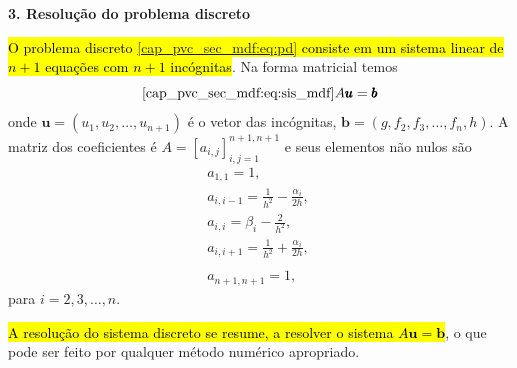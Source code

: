 \begin{flushleft}
  {\bf 3. Resolução do problema discreto}
\end{flushleft}

\hl{O problema discreto {\eqref{cap_pvc_sec_mdf:eq:pd}} consiste em um sistema linear de $n+1$ equações com $n+1$ incógnitas}. Na forma matricial temos
\begin{equation}\eqref{cap_pvc_sec_mdf:eq:sis_mdf}
  A\pmb{u} = \pmb{b}
\end{equation}
onde $\pmb{u} = (u_1, u_2, \dotsc, u_{n+1})$ é o vetor das incógnitas, $\pmb{b} = (g, f_2, f_3, \dotsc, f_{n}, h)$. A matriz dos coeficientes é  $A = [a_{i,j}]_{i,j=1}^{n+1,n+1}$ e seus elementos não nulos são
\begin{align}
  &a_{1,1} = 1,
  & ~ \nonumber \\
  &a_{i,i-1} = \frac{1}{h^2}-\frac{\alpha_i}{2h},\\
  &a_{i,i} = \beta_i - \frac{2}{h^2}, \\
  &a_{i,i+1} = \frac{1}{h^2}+\frac{\alpha_i}{2h},\\
  & ~ \nonumber \\
  &a_{n+1,n+1} = 1,
\end{align}
para $i = 2, 3, \dotsc, n$.

\hl{A resolução do sistema discreto se resume, a resolver o sistema $A\pmb{u} = \pmb{b}$}, o que pode ser feito por qualquer método numérico apropriado.

